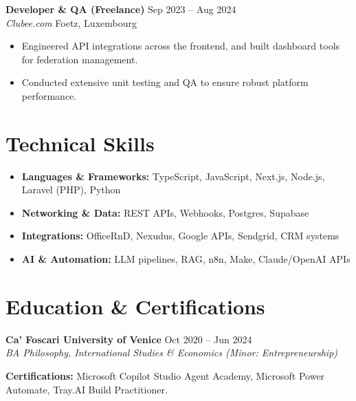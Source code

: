 \documentclass[11pt,a4paper]{article}
\begin{document}
\vspace{0.2cm}
\noindent\textbf{Developer \& QA (Freelance)} \hfill Sep 2023 -- Aug 2024 \\
\textit{Clubee.com} \hfill Foetz, Luxembourg
\begin{itemize}[noitemsep,topsep=0pt]
    \item Engineered API integrations across the frontend, and built dashboard tools for federation management.
    \item Conducted extensive unit testing and QA to ensure robust platform performance.
\end{itemize}

\section*{Technical Skills}
\begin{itemize}[noitemsep,topsep=0pt]
    \item \textbf{Languages \& Frameworks:} TypeScript, JavaScript, Next.js, Node.js, Laravel (PHP), Python
    \item \textbf{Networking \& Data:} REST APIs, Webhooks, Postgres, Supabase
    \item \textbf{Integrations:} OfficeRnD, Nexudus, Google APIs, Sendgrid, CRM systems
    \item \textbf{AI \& Automation:} LLM pipelines, RAG, n8n, Make, Claude/OpenAI APIs
\end{itemize}

\section*{Education \& Certifications}
\noindent\textbf{Ca' Foscari University of Venice} \hfill Oct 2020 -- Jun 2024 \\
\textit{BA Philosophy, International Studies \& Economics (Minor: Entrepreneurship)}

\vspace{0.2cm}
\noindent\textbf{Certifications:} Microsoft Copilot Studio Agent Academy, Microsoft Power Automate, Tray.AI Build Practitioner.
\end{document}
